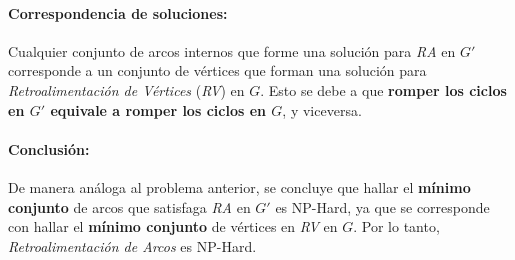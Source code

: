 \documentclass[12pt]{article}
\begin{document}
\paragraph{Correspondencia de soluciones:}
Cualquier conjunto de arcos internos que forme una solución para \textit{RA} en $G'$ 
corresponde a un conjunto de vértices que forman una solución para 
\textit{Retroalimentación de Vértices} (\textit{RV}) en $G$. Esto se debe a que \textbf{romper 
los ciclos en $G'$ equivale a romper los ciclos en $G$}, y viceversa.

\paragraph{Conclusión:}
De manera análoga al problema anterior, se concluye que hallar el \textbf{mínimo conjunto} 
de arcos que satisfaga \textit{RA} en $G'$ es NP-Hard, ya que se corresponde con 
hallar el \textbf{mínimo conjunto} de vértices en \textit{RV} en $G$. Por lo tanto, 
\textit{Retroalimentación de Arcos} es NP-Hard.
\end{document}
